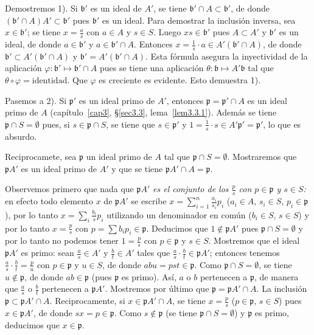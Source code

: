 \documentclass[bibtotoc,leqno,spanish]{amsbook}
\newcommand{\idl}[1]{\mathfrak{#1}}
\numberwithin{equation}{section}
\theoremstyle{note}
\theoremstyle{note}
\theoremstyle{rem}
\numberwithin{theorem}{section}
\numberwithin{proposition}{section}
\numberwithin{definition}{section}
\numberwithin{lemma}{section}
\numberwithin{corollary}{section}
\numberwithin{example}{section}
\numberwithin{footnote}{section}%
\begin{document}
Demostremos 1). Si $\idl{b}'$ es un ideal de $A'$, se tiene $\idl{b}'\cap A\subset\idl{b}'$, de donde
$(\idl{b}'\cap A)A'\subset\idl{b}'$ pues $\idl{b}'$ es un ideal. Para demostrar la inclusi\'on inversa, sea
$x\in\idl{b}'$; se tiene $x = \frac{a}{s}$ con $a\in A$ y $s\in S$. Luego $xs\in\idl{b}'$ pues
$A\subset A'$ y $\idl{b}'$ es un ideal, de donde $a\in\idl{b}'$ y $a\in\idl{b}'\cap A$. Entonces
$x=\frac{1}{s}\cdot a\in A'(\idl{b}'\cap A)$, de donde $\idl{b}'\subset A'(\idl{b}'\cap A)$ y
$\idl{b}'=A'(\idl{b}'\cap A)$. Esta f\'ormula asegura la inyectividad de la aplicaci\'on
$\varphi:\idl{b}'\mapsto\idl{b}'\cap A$ pues se tiene una aplicaci\'on $\theta:\idl{b}\mapsto A'\idl{b}$
tal que $\theta\circ\varphi = \text{identidad}$. Que $\varphi$ es creciente es evidente. Esto demuestra 1).

Pasemos a 2). Si $\idl{p}'$ es un ideal primo de $A'$, entonces $\idl{p} = \idl{p}'\cap A$ es un ideal primo de $A$
(cap\'itulo~\ref{cap3}, \S\ref{sec3.3}, lema~\ref{lem3.3.1}).
Adem\'as se tiene $\idl{p}\cap S=\emptyset$ pues, si
$s\in\idl{p}\cap S$, se tiene que $s\in\idl{p}'$ y $1=\frac{1}{s}\cdot s\in A'\idl{p}'=\idl{p}'$, lo que
es absurdo.

Reciprocamete, sea $\idl{p}$ un ideal primo de $A$ tal que $\idl{p}\cap S=\emptyset$. Mostraremos que
$\idl{p}A'$ es un ideal primo de $A'$ y que se tiene $\idl{p}A'\cap A = \idl{p}$.

Observemos primero que nada que $\idl{p}A'$ {\em es el conjunto de los $\frac{p}{s}$ con
$p\in\idl{p}$ y $s\in S$:} en efecto todo elemento $x$ de $\idl{p}A'$ se escribe
$x=\sum_{i=1}^{n}\frac{a_{i}}{s_{i}}p_{i}$
($a_{i}\in A$, $s_{i}\in S$, $p_{i}\in\idl{p}$), por lo tanto $x=\sum_{i}\frac{b_{i}}{s}p_{i}$ utilizando
un denominador en com\'un ($b_{i}\in S$, $s\in S$) y por lo tanto $x = \frac{p}{s}$ con $p=\sum b_{i}p_{i}\in\idl{p}$.
Deducimos que $1\notin\idl{p}A'$ pues $\idl{p}\cap S=\emptyset$ y por lo tanto no podemos tener
$1=\frac{p}{s}$ con $p\in\idl{p}$ y $s\in S$. Mostremos que el ideal $\idl{p}A'$ es primo:
sean $\frac{a}{s}\in A'$ y $\frac{b}{t}\in A'$ tales que $\frac{a}{s}\cdot\frac{b}{t}\in\idl{p}A'$; entonces
tenemos $\frac{a}{s}\cdot\frac{b}{t} = \frac{p}{u}$ con $p\in\idl{p}$ y $u\in S$, de donde
$abu = pst\in\idl{p}$. Como $\idl{p}\cap S=\emptyset$, se tiene $u\notin\idl{p}$, de donde $ab\in\idl{p}$
(pues $\idl{p}$ es primo). As\'i, $a$ o $b$ pertenecen a $\idl{p}$, de manera que
$\frac{a}{s}$ o $\frac{b}{t}$ pertenecen a $\idl{p}A'$. Mostremos por \'ultimo que $\idl{p}=\idl{p}A'\cap A$.
La inclusi\'on $\idl{p}\subset\idl{p}A'\cap A$. Reciprocamente, si $x\in\idl{p}A'\cap A$, se tiene
$x = \frac{p}{s}$ ($p\in\idl{p}$, $s\in S$) pues $x\in\idl{p}A'$, de donde $sx = p\in\idl{p}$. Como
$s\notin\idl{p}$ (se tiene $\idl{p}\cap S = \emptyset$) y $\idl{p}$ es primo, deducimos que $x\in\idl{p}$.
\end{document}
